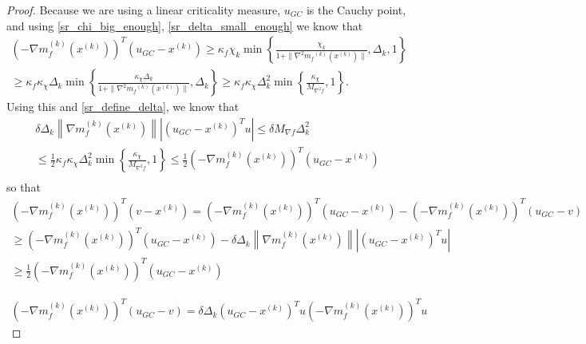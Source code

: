 \documentclass{article}
\theoremstyle{case}
\newcommand{\xk}{{x^{(k)}}}
\newcommand{\dk}{\Delta_k}
\newcommand{\gfmin}{M_{\nabla f}}
\newcommand{\mfk}{{{m}_f}^{(k)}}
\newcommand{\gk}{{\nabla m_f^{(k)}(x^{(k)})}}
\newcommand{\hfb}{{M_{\nabla^2 f}}}
\begin{document}
\begin{proof}
Because we are using a linear criticality measure, $u_{GC}$ is the Cauchy point, and using \cref{sr_chi_big_enough}, \cref{sr_delta_small_enough} we know that
\begin{align*}
\left(-\gk\right)^T\left(u_{GC} - \xk\right) \ge \kappa_f \chi_k \min\left\{ \frac{\chi_k}{1+\|\nabla^2 \mfk(\xk)\|}, \dk, 1 \right\} \\
 \ge \kappa_f \kappa_{\chi} \dk \min\left\{ \frac{\kappa_{\chi} \dk}{1+\|\nabla^2 \mfk(\xk)\|}, \dk \right\}
 \ge \kappa_f \kappa_{\chi} \dk^2 \min\left\{ \frac{\kappa_{\chi}}{\hfb}, 1 \right\}.
\end{align*}
Using this and \cref{sr_define_delta}, we know that
\begin{align*}
\delta \dk  \left\|\gk\right \|  \left|\left(u_{GC}- \xk\right)^T u\right| \le \delta\gfmin  \dk^2  \\
\le \frac 1 2 \kappa_f \kappa_{\chi} \dk^2 \min\left\{ \frac{\kappa_{\chi}}{\hfb}, 1 \right\}
\le \frac 1 2 \left(-\gk\right)^T\left(u_{GC} - \xk\right) \\
\end{align*}
so that
\begin{align*}
\left(-\gk\right)^T\left(v - \xk\right) = \left(-\gk\right)^T\left(u_{GC} - \xk\right) -  \left(-\gk\right)^T\left(u_{GC} - v\right) \\
\ge\left(-\gk\right)^T\left(u_{GC} - \xk\right)  - \delta \dk \left\|\gk\right \|  \left|\left(u_{GC}- \xk\right)^T u\right|  \\
\ge \frac 1 2 \left(-\gk\right)^T\left(u_{GC} - \xk\right)
\end{align*}






\begin{align*}
\left(-\gk\right)^T\left(u_{GC} - v\right) = \delta\dk\left(u_{GC} - \xk\right)^Tu\left(-\gk\right)^Tu
\end{align*}



\end{proof}
\end{document}
